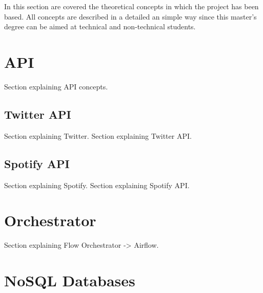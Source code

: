 

\nonzeroparskip In this section are covered the theoretical concepts in which the project has been based. All concepts are described in a detailed an simple way since this master's degree can be aimed at technical and non-technical students.

\section{API}

\nonzeroparskip Section explaining API concepts.

\subsection{Twitter API}
\nonzeroparskip Section explaining Twitter.
\nonzeroparskip Section explaining Twitter API.

\subsection{Spotify API}
\nonzeroparskip Section explaining Spotify.
\nonzeroparskip Section explaining Spotify API.

\section{Orchestrator}

\nonzeroparskip Section explaining Flow Orchestrator -> Airflow.

\section{NoSQL Databases}

